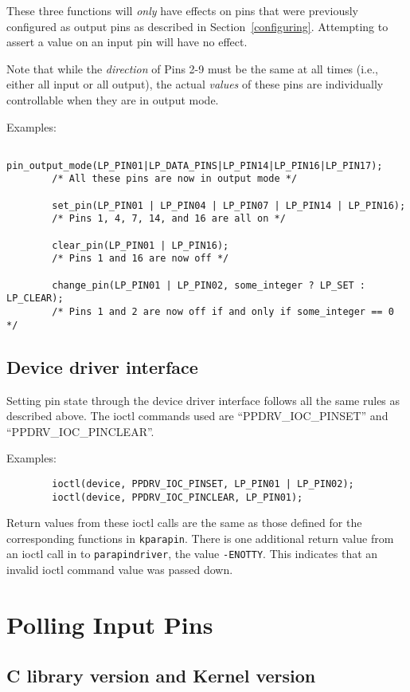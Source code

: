 \documentclass{article}
\begin{document}
These three functions will {\em only} have effects on pins that were
previously configured as output pins as described in
Section~\ref{configuring}.  Attempting to assert a value on an input
pin will have no effect.

Note that while the {\em direction} of Pins 2-9 must be the same at
all times (i.e., either all input or all output), the actual {\em
values} of these pins are individually controllable when they are in
output mode.

Examples:
\begin{verbatim}
        pin_output_mode(LP_PIN01|LP_DATA_PINS|LP_PIN14|LP_PIN16|LP_PIN17);
        /* All these pins are now in output mode */

        set_pin(LP_PIN01 | LP_PIN04 | LP_PIN07 | LP_PIN14 | LP_PIN16);
        /* Pins 1, 4, 7, 14, and 16 are all on */

        clear_pin(LP_PIN01 | LP_PIN16);
        /* Pins 1 and 16 are now off */

        change_pin(LP_PIN01 | LP_PIN02, some_integer ? LP_SET : LP_CLEAR);
        /* Pins 1 and 2 are now off if and only if some_integer == 0 */
\end{verbatim}

\subsection{Device driver interface}

Setting pin state through the device driver interface follows all
the same rules as described above.
The ioctl commands used are ``PPDRV\_IOC\_PINSET'' and
``PPDRV\_IOC\_PINCLEAR''.

Examples:
\begin {verbatim}
        ioctl(device, PPDRV_IOC_PINSET, LP_PIN01 | LP_PIN02);
        ioctl(device, PPDRV_IOC_PINCLEAR, LP_PIN01);
\end{verbatim}

Return values from these ioctl calls are the same as those defined for
the corresponding functions in {\tt kparapin}.  There is one additional
return value from an ioctl call in to {\tt parapindriver}, the value
{\tt -ENOTTY}.  This indicates that an invalid ioctl command value was
passed down.


\section{Polling Input Pins}
\label{polling}
\subsection{C library version and Kernel version}
\end{document}
